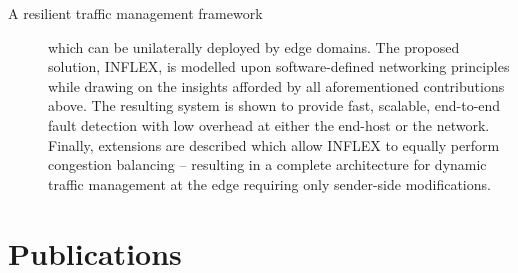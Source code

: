 \begin{description}
\item[A resilient traffic management framework] which can be unilaterally deployed by edge domains.
The proposed solution, INFLEX, is modelled upon software-defined networking principles while drawing on the insights afforded by all aforementioned contributions above.
The resulting system is shown to provide fast, scalable, end-to-end fault detection with low overhead at either the end-host or the network.
Finally, extensions are described which allow INFLEX to equally perform congestion balancing -- resulting in a complete architecture for dynamic traffic management at the edge requiring only sender-side modifications.
\end{description}


\section{Publications}
\label{sec:introduction:contributions}

